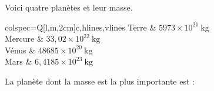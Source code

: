 
Voici quatre planètes et leur masse.

\begin{Centrage}
	\begin{tblr}{colspec={Q[l,m,2cm]c},hlines,vlines}
	Terre & $5973 \times 10^{21}~\mathrm{kg}$ \\
	Mercure & $33,02 \times 10^{22}~\mathrm{kg}$ \\
	Vénus & $48685 \times 10^{20}~\mathrm{kg}$ \\
	Mars & $6,4185 \times 10^{23}~\mathrm{kg}$ \\
	\end{tblr}
\end{Centrage}

La planète dont la masse est la plus importante est :

\smallskip

